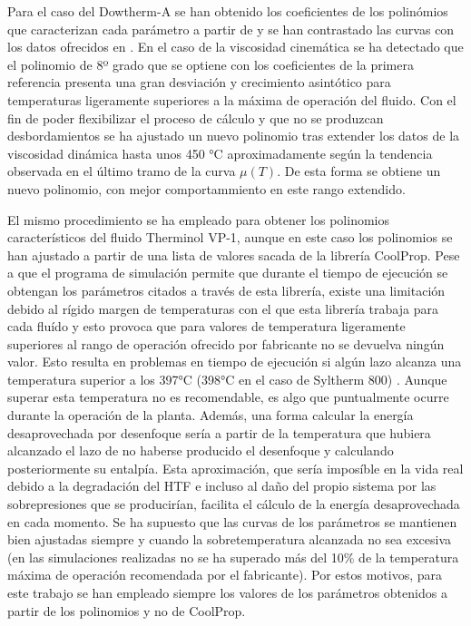 Para el caso del Dowtherm-A se han obtenido los coeficientes de los
polinómios que caracterizan cada parámetro a partir de
\cite{1022085/C5UIUT2V} y se han contrastado las curvas con los datos
ofrecidos en \cite{1022085/LB9BTEXK}. En el caso de la viscosidad
cinemática se ha detectado que el polinomio de 8º grado que se optiene
con los coeficientes de la primera referencia presenta una gran
desviación y crecimiento asintótico para temperaturas ligeramente
superiores a la máxima de operación del fluido. Con el fin de poder
flexibilizar el proceso de cálculo y que no se produzcan desbordamientos
se ha ajustado un nuevo polinomio tras extender los datos de la
viscosidad dinámica hasta unos 450 °C aproximadamente según la tendencia
observada en el último tramo de la curva \(\mu(T)\). De esta forma se
obtiene un nuevo polinomio, con mejor comportammiento en este rango
extendido.

El mismo procedimiento se ha empleado para obtener los polinomios
característicos del fluido Therminol VP-1, aunque en este caso los
polinomios se han ajustado a partir de una lista de valores sacada de la
librería CoolProp. Pese a que el programa de simulación permite que
durante el tiempo de ejecución se obtengan los parámetros citados a
través de esta librería, existe una limitación debido al rígido margen
de temperaturas con el que esta librería trabaja para cada fluído y esto
provoca que para valores de temperatura ligeramente superiores al rango
de operación ofrecido por fabricante no se devuelva ningún valor. Esto
resulta en problemas en tiempo de ejecución si algún lazo alcanza una
temperatura superior a los 397°C (398°C en el caso de Syltherm 800) .
Aunque superar esta temperatura no es recomendable, es algo que
puntualmente ocurre durante la operación de la planta. Además, una forma
calcular la energía desaprovechada por desenfoque sería a partir de la
temperatura que hubiera alcanzado el lazo de no haberse producido el
desenfoque y calculando posteriormente su entalpía. Esta aproximación,
que sería imposíble en la vida real debido a la degradación del HTF e
incluso al daño del propio sistema por las sobrepresiones que se
producirían, facilita el cálculo de la energía desaprovechada en cada
momento. Se ha supuesto que las curvas de los parámetros se mantienen
bien ajustadas siempre y cuando la sobretemperatura alcanzada no sea
excesiva (en las simulaciones realizadas no se ha superado más del 10\%
de la temperatura máxima de operación recomendada por el fabricante).
Por estos motivos, para este trabajo se han empleado siempre los valores
de los parámetros obtenidos a partir de los polinomios y no de CoolProp.

